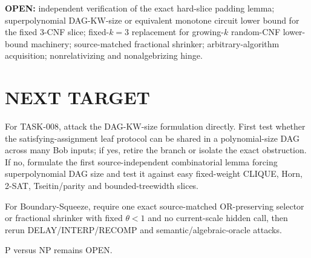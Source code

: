 \documentclass[11pt]{article}
\begin{document}
\textbf{OPEN:} independent verification of the exact hard-slice padding lemma; superpolynomial DAG-KW-size or equivalent monotone circuit lower bound for the fixed $3$-CNF slice; fixed-$k=3$ replacement for growing-$k$ random-CNF lower-bound machinery; source-matched fractional shrinker; arbitrary-algorithm acquisition; nonrelativizing and nonalgebrizing hinge.

\section*{NEXT TARGET}
For TASK-008, attack the DAG-KW-size formulation directly. First test whether the satisfying-assignment leaf protocol can be shared in a polynomial-size DAG across many Bob inputs; if yes, retire the branch or isolate the exact obstruction. If no, formulate the first source-independent combinatorial lemma forcing superpolynomial DAG size and test it against easy fixed-weight CLIQUE, Horn, 2-SAT, Tseitin/parity and bounded-treewidth slices.

For Boundary-Squeeze, require one exact source-matched OR-preserving selector or fractional shrinker with fixed $\theta<1$ and no current-scale hidden call, then rerun DELAY/INTERP/RECOMP and semantic/algebraic-oracle attacks.

P versus NP remains OPEN.
\end{document}
